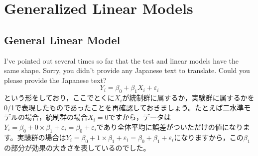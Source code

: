 \documentclass{ltjsbook}
\begin{document}
\chapter{Generalized Linear Models}
\VerbatimFootnotes
\label{x24_linearModel}
\section{General Linear Model}
I've pointed out several times so far that the test and linear models have the same shape.
Sorry, you didn't provide any Japanese text to translate. Could you please provide the Japanese text?
\[ Y_{i} = \beta_0 + \beta_1 X_{i} + \varepsilon_{i}\]
という形をしており，ここでとくに$X_{i}$が統制群に属するか，実験群に属するかを0/1で表現したものであったことを再確認しておきましょう。たとえば二水準モデルの場合，統制群の場合$X_i=0$ですから，データは$Y_i = \beta_0 + 0\times \beta_1+ \varepsilon_{i} = \beta_0+ \varepsilon_{i}$であり全体平均に誤差がついただけの値になります。実験群の場合は$Y_i = \beta_0 + 1 \times \beta_1 + \varepsilon_{i}= \beta_0 + \beta_1+ \varepsilon_{i}$になりますから，この$\beta_1$の部分が効果の大きさを表しているのでした。
\end{document}
